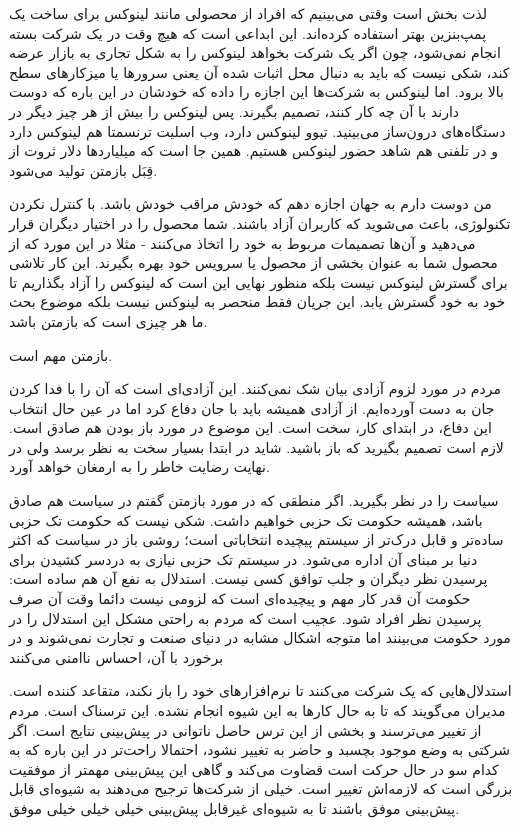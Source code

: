 لذت بخش است وقتی می‌بینیم که افراد از محصولی مانند لینوکس برای ساخت یک
پمپ‌بنزین بهتر استفاده کرده‌اند. این ابداعی است که هیچ وقت در یک شرکت
بسته انجام نمی‌شود، چون اگر یک شرکت بخواهد لینوکس را به شکل تجاری به
بازار عرضه کند، شکی نیست که باید به دنبال محل اثبات شده آن یعنی سرورها
یا میزکارهای سطح بالا برود. اما لینوکس به شرکت‌ها این اجازه را داده که
خودشان در این باره که دوست دارند با آن چه کار کنند، تصمیم‌ بگیرند. پس
لینوکس را بیش از هر چیز دیگر در دستگاه‌های درون‌ساز
می‌بینید. تیوو لینوکس دارد، وب اسلیت ترنسمتا هم
لینوکس دارد و در تلفنی هم شاهد حضور لینوکس
هستیم. همین جا است که میلیاردها دلار ثروت از قِبَل بازمتن تولید می‌شود.

من دوست دارم به جهان اجازه دهم که خودش مراقب خودش باشد. با کنترل نکردن
تکنولوژی، باعث می‌شوید که کاربران آزاد باشند. شما محصول را در اختیار
دیگران قرار می‌دهید و آن‌ها تصمیمات مربوط به خود را اتخاذ می‌کنند - مثلا
در این مورد که از محصول شما به عنوان بخشی از محصول یا سرویس خود بهره
بگیرند. این کار تلاشی برای گسترش لینوکس نیست بلکه منظور نهایی این است
که لینوکس را آزاد بگذاریم تا خود به خود گسترش یابد. این جریان فقط
منحصر به لینوکس نیست بلکه موضوع بحث ما هر چیزی است که بازمتن باشد.

بازمتن مهم است.

مردم در مورد لزوم آزادی بیان شک نمی‌کنند. این آزادی‌ای است که آن را با
فدا کردن جان به دست آورده‌ایم. از آزادی همیشه باید با جان دفاع کرد اما
در عین حال انتخاب این دفاع، در ابتدای کار، سخت است. این موضوع در مورد
باز بودن هم صادق است. لازم است تصمیم بگیرید که باز باشید. شاید در
ابتدا بسیار سخت به نظر برسد ولی در نهایت رضایت خاطر را به ارمغان خواهد
آورد.

سیاست را در نظر بگیرید. اگر منطقی که در مورد بازمتن گفتم در سیاست هم
صادق باشد، همیشه حکومت تک حزبی خواهیم داشت. شکی نیست که حکومت تک حزبی
ساده‌تر و قابل درک‌تر از سیستم پیچیده انتخاباتی است؛ روشی باز در سیاست
که اکثر دنیا بر مبنای آن اداره می‌شود. در سیستم تک حزبی نیازی به دردسر
کشیدن برای پرسیدن نظر دیگران و جلب توافق کسی نیست. استدلال به نفع آن
هم ساده است: حکومت آن قدر کار مهم و پیچیده‌ای است که لزومی نیست دائما
وقت آن صرف پرسیدن نظر افراد شود. عجیب است که مردم به راحتی مشکل این
استدلال را در مورد حکومت می‌بینند اما متوجه اشکال مشابه در دنیای صنعت و
تجارت نمی‌شوند و در برخورد با آن، احساس ناامنی می‌کنند

استدلال‌هایی که یک شرکت می‌کنند تا نرم‌افزارهای خود را باز نکند، متقاعد
کننده است. مدیران می‌گویند که تا به حال کارها به این شیوه انجام
نشده. این ترسناک است. مردم از تغییر می‌ترسند و بخشی از این ترس حاصل
ناتوانی در پیش‌بینی نتایج است. اگر شرکتی به وضع موجود بچسبد و حاضر به
تغییر نشود، احتمالا راحت‌تر در این باره که به کدام سو در حال حرکت است
قضاوت می‌کند و گاهی این پیش‌بینی مهمتر از موفقیت بزرگی است که لازمه‌اش
تغییر است. خیلی از شرکت‌ها ترجیح می‌دهند به شیوه‌ای قابل پیش‌بینی موفق
باشند تا به شیوه‌ای غیرقابل پیش‌بینی خیلی خیلی خیلی موفق.

